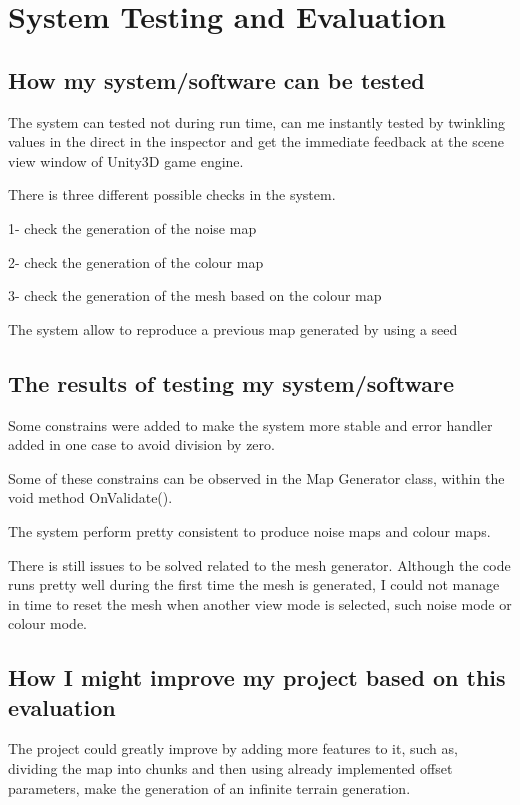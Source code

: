 \documentclass[a4paper,12pt]{book}
\begin{document}
\chapter{System Testing and Evaluation}
\section{How my system/software can be tested}

The system can tested not during run time, can me instantly tested by twinkling values in the direct in the inspector and get the immediate feedback at the scene view window of Unity3D game engine.

There is three different possible checks in the system.

1- check the generation of the noise map

2- check the generation of the colour map

3- check the generation of the mesh based on the colour map

The system allow to reproduce a previous map generated by using a seed




\section{The results of testing my system/software}

Some constrains were added to make the system more stable and error handler added in one case to avoid division by zero.

Some of these constrains can be observed in the Map Generator class, within the void method OnValidate().

The system perform pretty consistent to produce noise maps and colour maps.

There is still issues to be solved related to the mesh generator. Although the code runs pretty well during the first time the mesh is generated, I could not manage in time to reset the mesh when another view mode is selected, such noise mode or colour mode.

\section{How I might improve my project based on this evaluation}

The project could greatly improve by adding more features to it, such as, dividing the map into chunks and then using already implemented offset parameters, make the generation of an infinite terrain generation.
\end{document}
